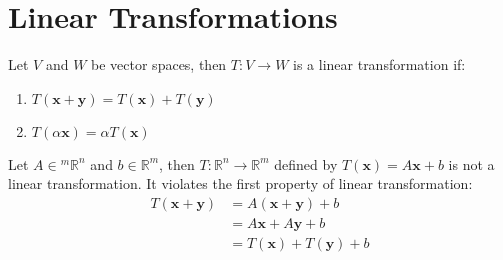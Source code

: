 \documentclass[11pt]{report}
\begin{document}
\section{Linear Transformations}
\begin{definition}
    Let $V$ and $W$ be vector spaces, then $T: V \rightarrow W$ is a linear transformation if:
    \begin{enumerate}
        \item $T(\textbf{x} + \textbf{y}) = T(\textbf{x}) + T(\textbf{y})$
        \item $T(\alpha \textbf{x}) = \alpha T(\textbf{x})$
    \end{enumerate}
\end{definition}
\begin{example}[$Ax + b$ is not LT]
    Let $A \in {^m\mathbb{R}^n}$ and $b \in \mathbb{R}^m$, then $T: \mathbb{R}^n \rightarrow \mathbb{R}^m$ defined by $T(\textbf{x}) = A\textbf{x} + b$ is not a linear transformation. It violates the first property of linear transformation:
    \begin{align*}
        T(\textbf{x} + \textbf{y}) &= A(\textbf{x} + \textbf{y}) + b \\
        &= A\textbf{x} + A\textbf{y} + b \\
        &= T(\textbf{x}) + T(\textbf{y}) + b
    \end{align*}
\end{example}
\end{document}
